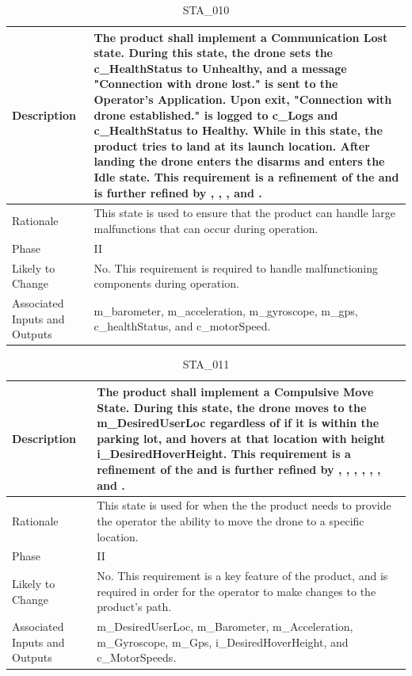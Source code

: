 \documentclass{article}
\begin{document}
\begin{table}[!h]
\begin{center}
\caption {STA\_010} 
\label{STA_010}
\begin{tabular}{ | m{3cm} | m{11cm} | }
\hline
Description & The product shall implement a Communication Lost state. During this state, the drone sets the c\_HealthStatus to Unhealthy, and a message "Connection with drone lost." is sent to the Operator's Application. Upon exit, "Connection with drone established." is logged to c\_Logs and c\_HealthStatus to Healthy. While in this state, the product tries to land at its launch location. After landing the drone enters the disarms and enters the Idle state. This requirement is a refinement of the \nameref{Communication Lost State} and is further refined by \nameref{PERF_007}, \nameref{SAFE_001}, \nameref{SAFE_003}, and \nameref{USE_003}. \\
\hline
Rationale & This state is used to ensure that the product can handle large malfunctions that can occur during operation. \\
\hline
Phase & II \\
\hline
Likely to Change & No. This requirement is required to handle malfunctioning components during operation. \\
\hline
Associated Inputs and Outputs & m\_barometer, m\_acceleration, m\_gyroscope, m\_gps, c\_healthStatus, and c\_motorSpeed. \\
\hline
\end{tabular}
\end{center}
\end{table}

\clearpage
\newpage

\begin{table}[!h]
\begin{center}
\caption {STA\_011} 
\label{STA_011}
\begin{tabular}{ | m{3cm} | m{11cm} | }
\hline
Description & The product shall implement a Compulsive Move State. During this state, the drone moves to the m\_DesiredUserLoc regardless of if it is within the parking lot, and hovers at that location with height i\_DesiredHoverHeight. This requirement is a refinement of the \nameref{Compulsive Move State} and is further refined by \nameref{PERF_003}, \nameref{PERF_004}, \nameref{PERF_006}, \nameref{PERF_007}, \nameref{SAFE_001}, \nameref{SAFE_003}, \nameref{PERF_008} and \nameref{USE_003}. \\
\hline
Rationale & This state is used for when the the product needs to provide the operator the ability to move the drone to a specific location. \\
\hline
Phase & II \\
\hline
Likely to Change & No. This requirement is a key feature of the product, and is required in order for the operator to make changes to the product's path. \\
\hline
Associated Inputs and Outputs & m\_DesiredUserLoc, m\_Barometer, m\_Acceleration, m\_Gyroscope, m\_Gps, i\_DesiredHoverHeight, and c\_MotorSpeeds. \\
\hline
\end{tabular}
\end{center}
\end{table}
\end{document}
